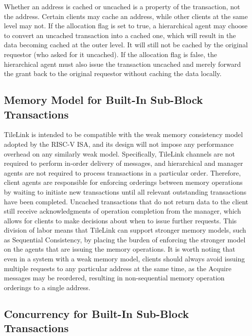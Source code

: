 Whether an address is cached or uncached is a property of the transaction, not the address. Certain clients may cache an address, while other clients at the same level may not. If the allocation flag is set to true, a hierarchical agent may choose to convert an uncached transaction into a cached one, which will result in the data becoming cached at the outer level. It will still not be cached by the original requestor (who asked for it uncached). If the allocation flag is false, the hierarchical agent must also issue the transaction uncached and merely forward the grant back to the original requestor without caching the data locally.
 
\subsection{Memory Model for Built-In Sub-Block Transactions}

TileLink is intended to be compatible with the weak memory consistency model adopted by the RISC-V ISA, and its design will not impose any performance overhead on any similarly weak model.
Specifically, TileLink channels are not required to perform in-order delivery of messages, and hierarchical and manager agents are not required to process transactions in a particular order.
Therefore, client agents are responsible for enforcing orderings between memory operations by
waiting to initiate new transactions until all relevant outstanding transactions have been completed.
Uncached transactions that do not return data to the client still receive
acknowledgments of operation completion from the manager,
which allows for clients to make decisions about when to issue further requests.
This division of labor means that TileLink can support stronger memory models,
such as Sequential Consistency, by placing the burden of enforcing the
stronger model on the agents that are issuing the memory operations.
It is worth noting that even in a system with a weak memory model, 
clients should always avoid issuing multiple requests to any particular address at the same time,
as the Acquire messages may be reordered, resulting in non-sequential memory operation orderings
to a single address.

\subsection{Concurrency for Built-In Sub-Block Transactions}

